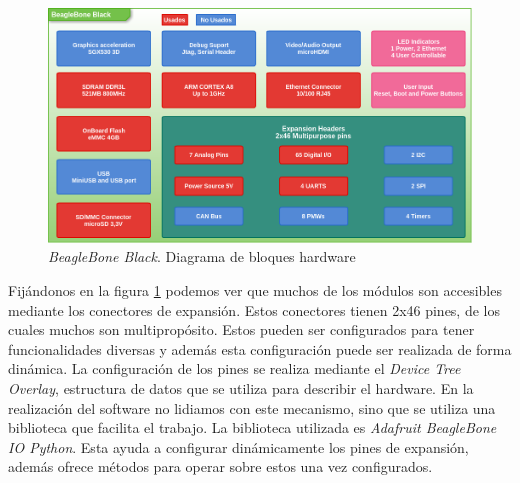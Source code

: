         \begin{figure}[h]
            \centering
            \includegraphics[keepaspectratio, width=1\textwidth]{./img/beaglebone.png}
            \caption{\emph{BeagleBone Black}. Diagrama de bloques hardware}
            \label{fig:beaglebone}
        \end{figure}
        \par
        Fijándonos en la figura \ref{fig:beaglebone} podemos ver que muchos de
        los módulos son accesibles mediante los conectores de
        expansión\cite{BeagleWikiExp}. Estos conectores tienen 2x46 pines, de
        los cuales muchos son multipropósito. Estos pueden ser configurados
        para tener funcionalidades diversas y además esta configuración puede
        ser realizada de forma dinámica. La configuración de los pines se
        realiza mediante el \emph{Device Tree Overlay}, estructura de datos que
        se utiliza para describir el hardware. En la realización del software
        no lidiamos con este mecanismo, sino que se utiliza una biblioteca que
        facilita el trabajo. La biblioteca utilizada es \emph{Adafruit
        BeagleBone IO Python}\cite{AdaFruitGit}. Esta ayuda a configurar
        dinámicamente los pines de expansión, además ofrece métodos para operar
        sobre estos una vez configurados.

